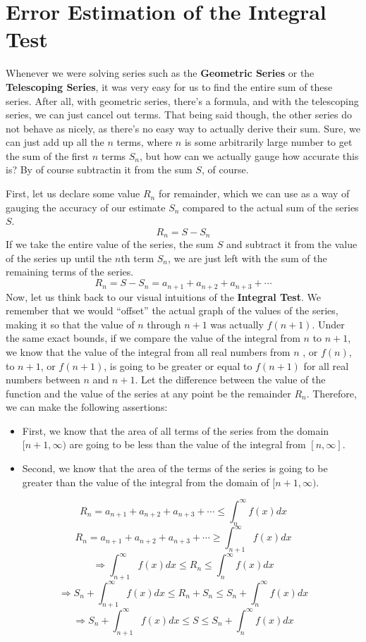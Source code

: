 \documentclass{report}
\begin{document}
\begin{sloppypar}
\section{Error Estimation of the Integral Test}
Whenever we were solving series
such as the \textbf{Geometric Series} or the
\textbf{Telescoping Series}, it was very
easy for us to find the entire sum of
these series. After all, with geometric
series, there's a formula, and with the
telescoping series, we can just cancel
out terms. That being said though,
the other series do not behave as nicely,
as there's no easy way to actually
derive their sum. Sure, we can just
add up all the $ n $ terms, where $ n $
is some arbitrarily large number to get
the sum of the first $ n $ terms $ S_{n}$,
but how can we actually gauge how accurate
this is? By of course subtractin it
from the sum $ S $, of course.
\par First, let us declare some
value $ R_{n} $ for remainder, which we can
use as a way of gauging the
accuracy of our estimate $ S_{n} $ compared
to the actual sum of the series $ S $.
\[ R_{n} = S - S_{n} \]
If we take the entire value of the series,
the sum $ S $ and subtract it from
the value of the series up until
the $ n$th term $ S_{n}$, we are just
left with the sum of the remaining
terms of the series.
\[ R_{n} = S - S_{n} = a_{n+1} +
  a_{n+2} + a_{n+3} + \cdots \]
Now, let us think back to our visual
intuitions of the \textbf{Integral Test}.
We remember that we would ``offset'' the
actual graph of the values of the series,
making it so that the value of $ n $
through $ n + 1 $ was actually $ f(n+1)$.
Under the same exact bounds,
if we compare the value of the integral
from $ n $ to $ n+ 1$, we know
that the value of the integral from
all real numbers from $ n $
, or $ f(n)$, to $ n+1 $, or $ f(n+1)$,
is going to be greater or equal to
$ f(n+1)$ for all real numbers between
$ n $ and $ n + 1 $. Let the
difference between the value
of the function and the
value of the series at any point
be the remainder $ R_{n} $.
Therefore,
we can make the following assertions:
\begin{itemize}
  \item First, we know that the
        area of all terms of the
        series from the domain
        $ [n+1, \infty) $ are going to be less than
        the value of the integral from
        $ [n, \infty]$.
  \item Second, we know that the
        area of the terms of the series
        is going to be greater than
        the value of the integral from the
        domain of
        $ [n+1, \infty) $.
        \end{itemize}
\[ R_{n} = a_{n+1} + a_{n+2} + a_{n+3} + \cdots
\leq \int_{n}^{\infty} f(x)dx \]
\[ R_{n} = a_{n+1} + a_{n+2} + a_{n+3} +
  \cdots \geq \int_{n+1}^{\infty} f(x)dx \]
\[ \Rightarrow \int_{n+1}^{\infty} f(x)dx \leq
  R_{n} \leq \int_{n}^{\infty} f(x)dx \]
\[ \Rightarrow S_{n} + \int_{n+1}^{\infty} f(x)dx \leq
  R_{n} + S_{n} \leq S_{n} +  \int_{n}^{\infty} f(x)dx \]
\[ \Rightarrow S_{n} + \int_{n+1}^{\infty} f(x)dx \leq
  S  \leq S_{n} +  \int_{n}^{\infty} f(x)dx \]


\end{sloppypar}
\end{document}
